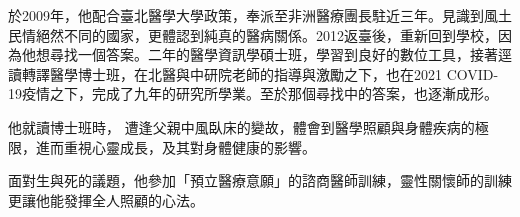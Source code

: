 \documentclass{letter}
\begin{document}
\begin{letter}

於2009年，他配合臺北醫學大學政策，奉派至非洲醫療團長駐近三年。見識到風土民情絕然不同的國家，更體認到純真的醫病關係。2012返臺後，重新回到學校，因為他想尋找一個答案。二年的醫學資訊學碩士班，學習到良好的數位工具，接著逕讀轉譯醫學博士班，在北醫與中研院老師的指導與激勵之下，也在2021 COVID-19疫情之下，完成了九年的研究所學業。至於那個尋找中的答案，也逐漸成形。


他就讀博士班時，%
遭逢父親中風臥床的變故，體會到醫學照顧與身體疾病的極限，進而重視心靈成長，及其對身體健康的影響。%

面對生與死的議題，他參加「預立醫療意願」的諮商醫師訓練，靈性關懷師的訓練更讓他能發揮全人照顧的心法。


\end{letter}
\end{document}
